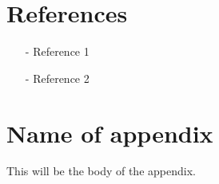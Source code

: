 \documentclass[reprint,english,notitlepage]{revtex4-2}
\begin{document}
\section*{References}  %
\begin{itemize}
\item[-]Reference 1
\item[-]Reference 2
\end{itemize}

\newpage
\appendix
\section{Name of appendix}
This will be the body of the appendix.
\end{document}
